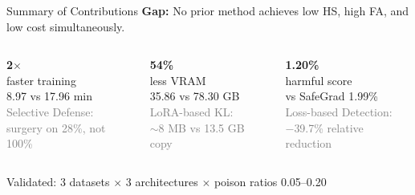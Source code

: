 \documentclass[aspectratio=169, 11pt]{beamer}
\begin{document}
\begin{frame}{Summary of Contributions}
\vspace{4pt}
\centering
{\small\textbf{Gap:} No prior method achieves low HS, high FA, and low cost simultaneously.}

\vspace{10pt}
\begin{columns}[c]
\centering
{\Huge\textcolor{safegreen}{\textbf{2$\times$}}}\\[4pt]
{\large faster training}\\[2pt]
8.97 vs 17.96 min\\[6pt]
{\footnotesize\textcolor{gray}{Selective Defense:\\surgery on 28\%, not 100\%}}

\centering
{\Huge\textcolor{safegreen}{\textbf{54\%}}}\\[4pt]
{\large less VRAM}\\[2pt]
35.86 vs 78.30 GB\\[6pt]
{\footnotesize\textcolor{gray}{LoRA-based KL:\\$\sim$8 MB vs 13.5 GB copy}}

\centering
{\Huge\textcolor{safegreen}{\textbf{1.20\%}}}\\[4pt]
{\large harmful score}\\[2pt]
vs SafeGrad 1.99\%\\[6pt]
{\footnotesize\textcolor{gray}{Loss-based Detection:\\$-$39.7\% relative reduction}}
\end{columns}

\vspace{12pt}
\centering
Validated: 3 datasets $\times$ 3 architectures $\times$ poison ratios 0.05--0.20
\end{frame}
\end{document}
